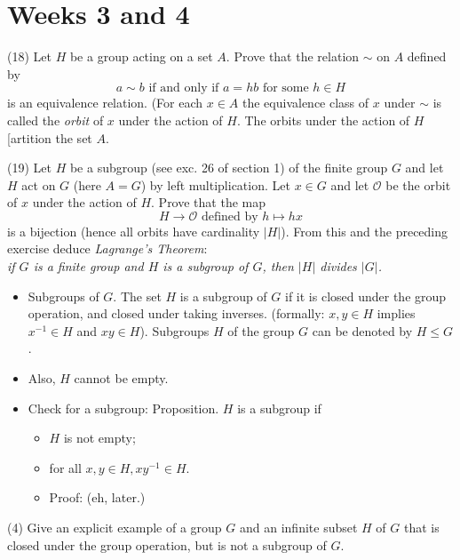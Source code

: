 \documentclass[1    0pt, answers]{exam} \renewcommand{\baselinestretch}{1.05}
\theoremstyle{plain}
\theoremstyle{definition}
\begin{document}
\section{Weeks 3 and 4}
\begin{questions}


\question (18) Let $H$ be a group acting on a set $A$. Prove that the relation $\sim$ on $A$ defined by \[ a \sim b \text{ if and only if } a = hb \text{ for some } h \in H \] is an equivalence relation. (For each $x \in A$ the equivalence class of $x$ under $\sim$ is called the \emph{orbit} of $x$ under the action of $H$. The orbits under the action of $H$ [artition the set $A$. 

\question (19) Let $H$ be a subgroup (see exc. 26 of section 1) of the finite group $G$ and let $H$ act on $G$ (here $A = G$) by left multiplication. Let $x \in G$ and let $\mathcal{O}$ be the orbit of $x$ under the action of $H$. Prove that the map \[ H \to \mathcal{O} \text{ defined by } h \mapsto h x \] is a bijection (hence all orbits have cardinality $|H|$). From this and the preceding exercise deduce \emph{Lagrange's Theorem}: \\
\emph{if $G$ is a finite group and $H$ is a subgroup of $G$, then $|H|$ divides $|G|$.}

\begin{itemize}
\item Subgroups of $G$. The set $H$ is a subgroup of $G$ if it is closed under the group operation, and closed under taking inverses. (formally: $x, y \in H$ implies $x^{-1} \in H$ and $x y \in H$). Subgroups $H$ of the group $G$ can be denoted by $H \leq G$.
\item Also, $H$ cannot be empty.
\item Check for a subgroup: Proposition. $H$ is a subgroup if
\begin{itemize}
    \item $H$ is not empty;
    \item for all $x, y \in H, xy^{-1} \in H$.
    \item Proof: (eh, later.)
\end{itemize}
\end{itemize}


\question (4) Give an explicit example of a group $G$ and an infinite subset $H$ of $G$ that is closed under the group operation, but is not a subgroup of $G$.


\end{questions}
\end{document}
